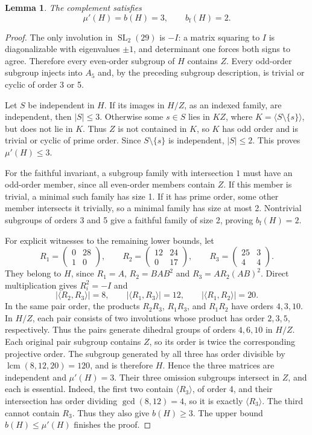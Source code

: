 \documentclass[11pt]{article}
\newtheorem{lemma}[theorem]{Lemma}
\theoremstyle{remark}\newtheorem{remark}[theorem]{Remark}
\newcommand{\mup}{\mu'}
\newcommand{\bfth}{b_{\mathrm f}}
\newcommand{\SL}{\operatorname{SL}}
\begin{document}
\begin{lemma}\label{lem:H}
The complement satisfies
\[
        \mup(H)=b(H)=3,\qquad \bfth(H)=2.
\]
\end{lemma}
\begin{proof}
The only involution in $\SL_2(29)$ is $-I$: a matrix squaring to $I$ is
diagonalizable with eigenvalues $\pm1$, and determinant one forces both
signs to agree. Therefore every even-order subgroup of $H$ contains $Z$.
Every odd-order subgroup injects into $A_5$ and, by the preceding subgroup
description, is trivial or cyclic of order 3 or 5.

Let $S$ be independent in $H$. If its images in $H/Z$, as an indexed family,
are independent, then $|S|\le3$. Otherwise some $s\in S$ lies in $KZ$, where
$K=\langle S\setminus\{s\}\rangle$, but does not lie in $K$. Thus $Z$ is not
contained in $K$, so $K$ has odd order and is trivial or cyclic of prime
order. Since $S\setminus\{s\}$ is independent, $|S|\le2$. This proves
$\mup(H)\le3$.

For the faithful invariant, a subgroup family with intersection $1$ must
have an odd-order member, since all even-order members contain $Z$. If this
member is trivial, a minimal such family has size 1. If it has prime order,
some other member intersects it trivially, so a minimal family has size at
most 2. Nontrivial subgroups of orders 3 and 5 give a faithful family of size
2, proving $\bfth(H)=2$.

For explicit witnesses to the remaining lower bounds, let
\begin{equation}\label{eq:R}
 R_1=\begin{pmatrix}0&28\\1&0\end{pmatrix},\qquad
 R_2=\begin{pmatrix}12&24\\0&17\end{pmatrix},\qquad
 R_3=\begin{pmatrix}25&3\\4&4\end{pmatrix}.
\end{equation}
They belong to $H$, since $R_1=A$, $R_2=BAB^2$ and
$R_3=AR_2(AB)^2$. Direct multiplication gives $R_i^2=-I$ and
\[
 |\langle R_2,R_3\rangle|=8,\qquad
 |\langle R_1,R_3\rangle|=12,\qquad
 |\langle R_1,R_2\rangle|=20.
\]
In the same pair order, the products $R_2R_3$, $R_1R_3$, and $R_1R_2$
have orders $4,3,10$. In $H/Z$, each pair consists of two involutions whose
product has order $2,3,5$, respectively. Thus the pairs generate dihedral
groups of orders $4,6,10$ in $H/Z$. Each original pair subgroup contains
$Z$, so its order is twice the corresponding projective order. The subgroup generated by
all three has order divisible by $\operatorname{lcm}(8,12,20)=120$, and is
therefore $H$. Hence the three matrices are independent and $\mup(H)=3$.
Their three omission subgroups intersect in $Z$, and each is essential.
Indeed, the first two contain $\langle R_3\rangle$, of order 4, and their
intersection has order dividing $\gcd(8,12)=4$, so it is exactly
$\langle R_3\rangle$. The third cannot contain $R_3$. Thus they also give $b(H)\ge3$. The upper bound
$b(H)\le\mup(H)$ finishes the proof.
\end{proof}
\end{document}

